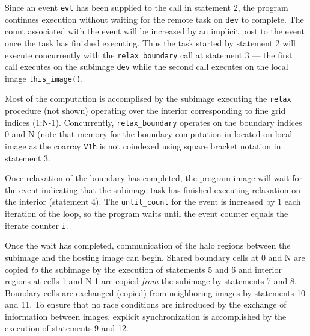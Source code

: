 Since an event \texttt{evt} has been supplied to the call in statement 2, the program
continues execution without waiting for the remote task on \texttt{dev} to complete.  The
count associated with the event will be increased by an implicit post to the event once
the task has finished executing.  Thus the task started by statement 2 will execute
concurrently with the \texttt{relax\_boundary} call at statement 3 --- the first call
executes on the subimage \texttt{dev} while the second call executes on the local image
\texttt{this\_image()}.

Most of the computation is accomplised by the subimage executing the \texttt{relax}
procedure (not shown) operating over the interior corresponding to fine grid indices (1:N-1).
Concurrently, \texttt{relax\_boundary} operates on the boundary indices 0 and N
(note that memory for the boundary computation in located on local image as
the coarray \texttt{V1h} is not coindexed using square bracket notation in statement 3.

Once relaxation of the boundary has completed, the program image will wait for the event
indicating that the subimage task has finished executing relaxation on the interior (statement
4).  The \texttt{until\_count} for the event is increased by 1 each iteration of the loop,
so the program waits until the event counter equals the iterate counter \texttt{i}.

Once the wait has completed, communication of the halo regions between the subimage and
the hosting image can begin.  Shared boundary cells at 0 and N are copied \emph{to} the
subimage by the execution of statements 5 and 6 and interior regions at cells 1 and N-1 are
copied \emph{from} the subimage by statements 7 and 8.  Boundary cells are exchanged (copied)
from neighboring images by statements 10 and 11.  To ensure that no race conditions are
introduced by the exchange of information between images, explicit synchronization is
accomplished by the execution of statements 9 and 12.

